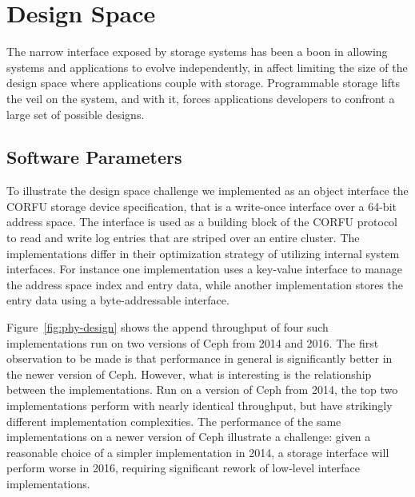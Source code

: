 \section{Design Space}
\label{sec:dspace}

The narrow interface exposed by storage systems has been a boon in allowing
systems and applications to evolve independently, in affect limiting the size
of the design space where applications couple with storage. Programmable
storage lifts the veil on the system, and with it, forces applications developers
to confront a large set of possible designs.

\subsection{Software Parameters}

To illustrate the design space challenge we implemented as an object interface
the CORFU storage device specification, that is a write-once interface over a
64-bit address space. The interface is used as a building block of the CORFU
protocol to read and write log entries that are striped over an entire
cluster.  The implementations differ in their optimization strategy of
utilizing internal system interfaces. For instance one implementation uses a
key-value interface to manage the address space index and entry data, while
another implementation stores the entry data using a byte-addressable
interface. 


Figure~\ref{fig:phy-design} shows the append throughput of four such
implementations run on two versions of Ceph from 2014 and 2016. The first
observation to be made is that performance in general is significantly better
in the newer version of Ceph. However, what is interesting is the relationship
between the implementations. Run on a version of Ceph from 2014, the top two
implementations perform with nearly identical throughput, but have strikingly
different implementation complexities. The performance of the same
implementations on a newer version of Ceph illustrate a challenge: given a
reasonable choice of a simpler implementation in 2014, a storage interface
will perform worse in 2016, requiring significant rework of low-level
interface implementations.

